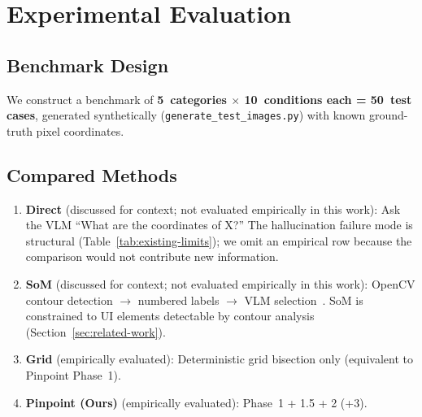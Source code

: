 \documentclass[sigconf,nonacm]{acmart}
\begin{document}
\section{Experimental Evaluation}
\label{sec:experiments}

\subsection{Benchmark Design}

We construct a benchmark of \textbf{5~categories $\times$ 10~conditions
each = 50~test cases}, generated synthetically
(\texttt{generate\_test\_images.py}) with known ground-truth pixel
coordinates.

\begin{table}[t]
\caption{Benchmark categories.}
\label{tab:categories}
\end{table}


\subsection{Compared Methods}

\begin{enumerate}
  \item \textbf{Direct} (discussed for context; not evaluated
    empirically in this work): Ask the VLM ``What are the coordinates
    of X?''  The hallucination failure mode is structural
    (Table~\ref{tab:existing-limits}); we omit an empirical row
    because the comparison would not contribute new information.
  \item \textbf{SoM} (discussed for context; not evaluated
    empirically in this work): OpenCV contour detection $\to$
    numbered labels $\to$ VLM selection~\cite{som}.  SoM is
    constrained to UI elements detectable by contour analysis
    (Section~\ref{sec:related-work}).
  \item \textbf{Grid} (empirically evaluated): Deterministic grid
    bisection only (equivalent to Pinpoint Phase~1).
  \item \textbf{Pinpoint (Ours)} (empirically evaluated): Phase~1 +
    1.5 + 2 (+3).
\end{enumerate}
\end{document}
